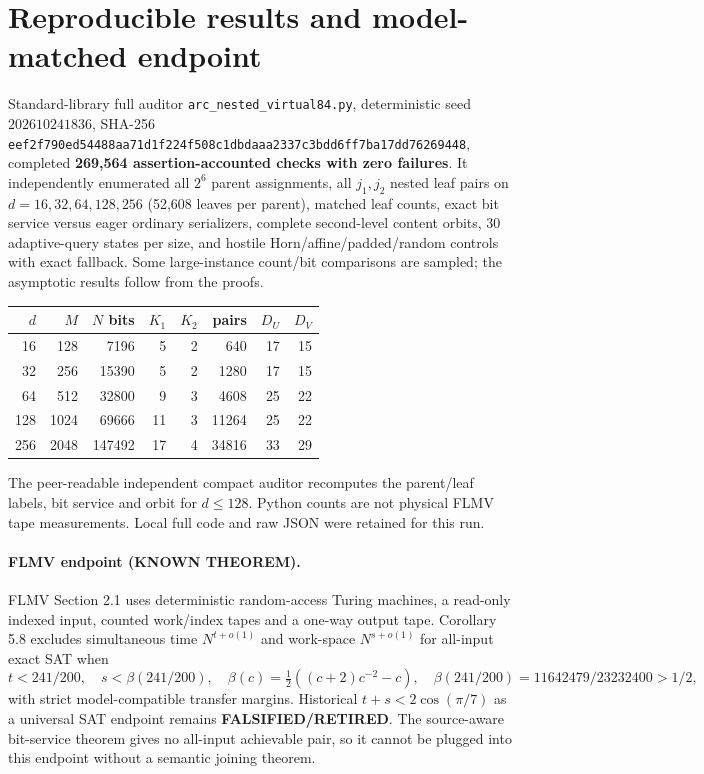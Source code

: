 \documentclass[11pt]{article}
\begin{document}
\section{Reproducible results and model-matched endpoint}
Standard-library full auditor \texttt{arc\_nested\_virtual84.py}, deterministic seed \(202610241836\), SHA-256 \texttt{eef2f790ed54488aa71d1f224f508c1dbdaaa2337c3bdd6ff7ba17dd76269448}, completed \textbf{269,564 assertion-accounted checks with zero failures}. It independently enumerated all \(2^6\) parent assignments, all \(j_1,j_2\) nested leaf pairs on \(d=16,32,64,128,256\) (52,608 leaves per parent), matched leaf counts, exact bit service versus eager ordinary serializers, complete second-level content orbits, 30 adaptive-query states per size, and hostile Horn/affine/padded/random controls with exact fallback. Some large-instance count/bit comparisons are sampled; the asymptotic results follow from the proofs.
\begin{center}\begin{tabular}{rrrrrrrr}\toprule
\(d\)&\(M\)&\(N\) bits&\(K_1\)&\(K_2\)&pairs&\(D_U\)&\(D_V\)\\\midrule
16&128&7196&5&2&640&17&15\\
32&256&15390&5&2&1280&17&15\\
64&512&32800&9&3&4608&25&22\\
128&1024&69666&11&3&11264&25&22\\
256&2048&147492&17&4&34816&33&29\\\bottomrule\end{tabular}\end{center}
The peer-readable independent compact auditor recomputes the parent/leaf labels, bit service and orbit for \(d\le128\). Python counts are not physical FLMV tape measurements. Local full code and raw JSON were retained for this run.

\paragraph{FLMV endpoint (KNOWN THEOREM).}
FLMV Section 2.1 uses deterministic random-access Turing machines, a read-only indexed input, counted work/index tapes and a one-way output tape. Corollary 5.8 excludes simultaneous time \(N^{t+o(1)}\) and work-space \(N^{s+o(1)}\) for all-input exact SAT when
\[
t<241/200,\quad s<\beta(241/200),\quad
\beta(c)=\tfrac12((c+2)c^{-2}-c),\quad
\beta(241/200)=11642479/23232400>1/2,
\]
with strict model-compatible transfer margins. Historical \(t+s<2\cos(\pi/7)\) as a universal SAT endpoint remains \textbf{FALSIFIED/RETIRED}. The source-aware bit-service theorem gives no all-input achievable pair, so it cannot be plugged into this endpoint without a semantic joining theorem.
\end{document}
